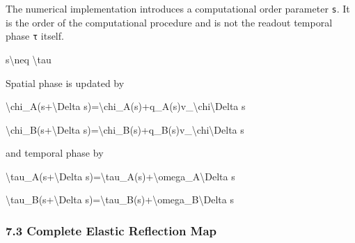 \documentclass[
  a4paper,
]{article}
\newenvironment{Shaded}{}{}
\newcommand{\NormalTok}[1]{#1}
\begin{document}
The numerical implementation introduces a computational order parameter
\texttt{s}. It is the order of the computational procedure and is not
the readout temporal phase \texttt{τ} itself.

\begin{Shaded}
\begin{Highlighting}[]
\NormalTok{s\textbackslash{}neq \textbackslash{}tau}
\end{Highlighting}
\end{Shaded}

Spatial phase is updated by

\begin{Shaded}
\begin{Highlighting}[]
\NormalTok{\textbackslash{}chi\_A(s+\textbackslash{}Delta s)=\textbackslash{}chi\_A(s)+q\_A(s)v\_\textbackslash{}chi\textbackslash{}Delta s}
\end{Highlighting}
\end{Shaded}

\begin{Shaded}
\begin{Highlighting}[]
\NormalTok{\textbackslash{}chi\_B(s+\textbackslash{}Delta s)=\textbackslash{}chi\_B(s)+q\_B(s)v\_\textbackslash{}chi\textbackslash{}Delta s}
\end{Highlighting}
\end{Shaded}

and temporal phase by

\begin{Shaded}
\begin{Highlighting}[]
\NormalTok{\textbackslash{}tau\_A(s+\textbackslash{}Delta s)=\textbackslash{}tau\_A(s)+\textbackslash{}omega\_A\textbackslash{}Delta s}
\end{Highlighting}
\end{Shaded}

\begin{Shaded}
\begin{Highlighting}[]
\NormalTok{\textbackslash{}tau\_B(s+\textbackslash{}Delta s)=\textbackslash{}tau\_B(s)+\textbackslash{}omega\_B\textbackslash{}Delta s}
\end{Highlighting}
\end{Shaded}

\subsubsection{7.3 Complete Elastic Reflection
Map}\label{complete-elastic-reflection-map}
\end{document}
